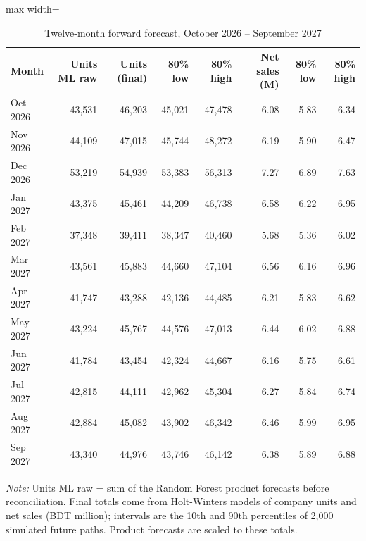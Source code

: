 \begin{table}[htbp]
\centering
\footnotesize
\caption{Twelve-month forward forecast, October 2026 -- September 2027}
\label{tab:future}
\begin{adjustbox}{max width=\linewidth}
\begin{tabular}{lrrrrrrr}
\toprule
\textbf{Month} & \textbf{Units ML raw} & \textbf{Units (final)} & \textbf{80\% low} & \textbf{80\% high} & \textbf{Net sales (M)} & \textbf{80\% low } & \textbf{80\% high } \\
\midrule
Oct 2026 & 43,531 & 46,203 & 45,021 & 47,478 & 6.08 & 5.83 & 6.34 \\
Nov 2026 & 44,109 & 47,015 & 45,744 & 48,272 & 6.19 & 5.90 & 6.47 \\
Dec 2026 & 53,219 & 54,939 & 53,383 & 56,313 & 7.27 & 6.89 & 7.63 \\
Jan 2027 & 43,375 & 45,461 & 44,209 & 46,738 & 6.58 & 6.22 & 6.95 \\
Feb 2027 & 37,348 & 39,411 & 38,347 & 40,460 & 5.68 & 5.36 & 6.02 \\
Mar 2027 & 43,561 & 45,883 & 44,660 & 47,104 & 6.56 & 6.16 & 6.96 \\
Apr 2027 & 41,747 & 43,288 & 42,136 & 44,485 & 6.21 & 5.83 & 6.62 \\
May 2027 & 43,224 & 45,767 & 44,576 & 47,013 & 6.44 & 6.02 & 6.88 \\
Jun 2027 & 41,784 & 43,454 & 42,324 & 44,667 & 6.16 & 5.75 & 6.61 \\
Jul 2027 & 42,815 & 44,111 & 42,962 & 45,304 & 6.27 & 5.84 & 6.74 \\
Aug 2027 & 42,884 & 45,082 & 43,902 & 46,342 & 6.46 & 5.99 & 6.95 \\
Sep 2027 & 43,340 & 44,976 & 43,746 & 46,142 & 6.38 & 5.89 & 6.88 \\
\bottomrule
\end{tabular}
\end{adjustbox}
\par\smallskip\parbox{0.92\linewidth}{\footnotesize\emph{Note:} Units ML raw = sum of the Random Forest product forecasts before reconciliation. Final totals come from Holt-Winters models of company units and net sales (BDT million); intervals are the 10th and 90th percentiles of 2,000 simulated future paths. Product forecasts are scaled to these totals.}
\end{table}